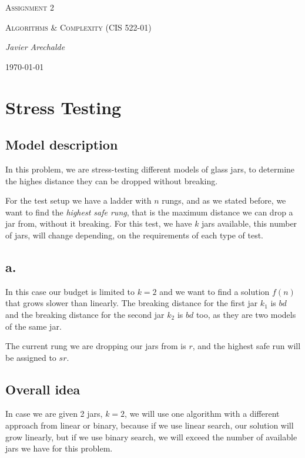 \documentclass{article}
\begin{document}
\begin{titlepage}
	\centering
	{\scshape\LARGE Assignment 2\par}
	\vspace{1cm}
	{\scshape\Large Algorithms \& Complexity (CIS 522-01)\par}
	\vspace{1.5cm}
	{\Large\itshape Javier Arechalde\par}
	\vfill
	{\large \today\par}
\end{titlepage}

\section*{Stress Testing}

\subsection*{Model description}

In this problem, we are stress-testing different models of glass jars, to determine the highes distance they can be dropped without breaking.

For the test setup we have a ladder with $n$ rungs, and as we stated before, we want to find the \textit{highest safe rung}, that is the maximum distance we can drop a jar from, without it breaking. For this test, we have $k$ jars available, this number of jars, will change depending, on the requirements of each type of test.

\subsection*{a.}

In this case our budget is limited to $k = 2$ and we want to find a solution $f(n)$ that grows slower than linearly. The breaking distance for the first jar $k_1$ is $bd$ and the breaking distance for the second jar $k_2$ is $bd$ too, as they are two models of the same jar.

The current rung we are dropping our jars from is $r$, and the highest safe run will be assigned to $sr$.

\subsection*{Overall idea}

In case we are given 2 jars, $k = 2$, we will use one algorithm with a different approach from linear or binary, because if we use linear search, our solution will grow linearly, but if we use binary search, we will exceed the number of available jars we have for this problem.
\end{document}
